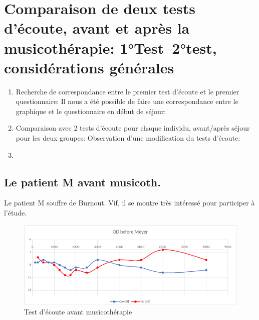       


  

\section{Comparaison de deux tests d'écoute, avant et après la musicothérapie: 1°Test--2°test, considérations générales}
	
        \begin{enumerate}
             
        \item Recherche de correspondance entre le premier test d'écoute et
     le premier questionnaire: Il nous a été possible de faire une
     correspondance entre le graphique et le questionnaire en début de
     séjour:


     
     
        \item Comparaison avec 2 tests d'écoute pour chaque individu,
          avant/après séjour pour les deux groupes:
          Observation d'une modification du tests d'écoute:


          
        
        \item
\end{enumerate}
	
\subsection{Le patient M avant musicoth.}

 	Le patient M souffre de Burnout. Vif, il se montre très
        intéressé pour participer à l'étude.
 
 	
 	\begin{figure}[tbh]
 		\centering
 		\includegraphics[width=0.7\linewidth]{images/clinique/od_before_meyer.png}
 		\caption{Test d'écoute avant musicothérapie}
 		\label{fig:odbeforemeyer}
 	\end{figure}
 	
 	
 	
 	
 	
